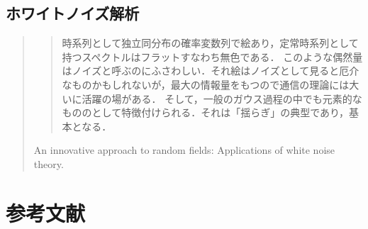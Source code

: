 \documentclass[uplatex,dvipdfmx]{jsreport}
\begin{document}
\section{ホワイトノイズ解析}

\begin{quotation}
    \begin{quote}
        時系列として独立同分布の確率変数列で絵あり，定常時系列として持つスペクトルはフラットすなわち無色である．
        このような偶然量はノイズと呼ぶのにふさわしい．それ絵はノイズとして見ると厄介なものかもしれないが，最大の情報量をもつので通信の理論には大いに活躍の場がある．
        そして，一般のガウス過程の中でも元素的なもののとして特徴付けられる．それは「揺らぎ」の典型であり，基本となる．
    \end{quote}
    An innovative approach to random fields: Applications of white noise theory.
\end{quotation}

\chapter{参考文献}
\end{document}
